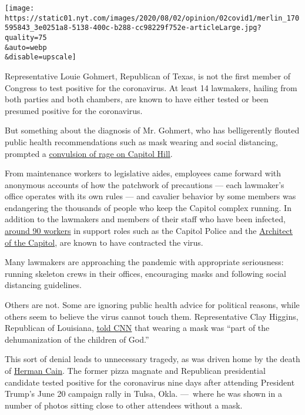 \texttt{[image: https://static01.nyt.com/images/2020/08/02/opinion/02covid1/merlin\_170595843\_3e0251a8-5138-400c-b288-cc98229f752e-articleLarge.jpg?quality=75\\\&auto=webp\\\&disable=upscale]}

Representative Louie Gohmert, Republican of Texas, is not the first
member of Congress to test positive for the coronavirus. At least 14
lawmakers, hailing from both parties and both chambers, are known to
have either tested or been presumed positive for the coronavirus.

But something about the diagnosis of Mr. Gohmert, who has belligerently
flouted public health recommendations such as mask wearing and social
distancing, prompted a
\href{https://www.politico.com/news/2020/07/30/capitol-hill-angry-gohmert-coronavirus-388230}{convulsion
of rage on Capitol Hill}.

From maintenance workers to legislative aides, employees came forward
with anonymous accounts of how the patchwork of precautions --- each
lawmaker's office operates with its own rules --- and cavalier behavior
by some members was endangering the thousands of people who keep the
Capitol complex running. In addition to the lawmakers and members of
their staff who have been infected,
\href{https://www.politico.com/news/2020/07/30/capitol-hill-angry-gohmert-coronavirus-388230}{around
90 workers} in support roles such as the Capitol Police and the
\href{https://www.aoc.gov/about-us/who-we-are}{Architect of the
Capitol}, are known to have contracted the virus.

Many lawmakers are approaching the pandemic with appropriate
seriousness: running skeleton crews in their offices, encouraging masks
and following social distancing guidelines.

Others are not. Some are ignoring public health advice for political
reasons, while others seem to believe the virus cannot touch them.
Representative Clay Higgins, Republican of Louisiana,
\href{https://www.cnn.com/2020/07/29/politics/pelosi-mask-mandate-capitol/index.html}{told
CNN} that wearing a mask was ``part of the dehumanization of the
children of God.''

This sort of denial leads to unnecessary tragedy, as was driven home by
the death of
\href{https://www.nytimes.com/2020/07/30/us/politics/herman-cain-dead.html}{Herman
Cain}. The former pizza magnate and Republican presidential candidate
tested positive for the coronavirus nine days after attending President
Trump's June 20 campaign rally in Tulsa, Okla. ---~where he was shown in
a number of photos sitting close to other attendees without a mask.

